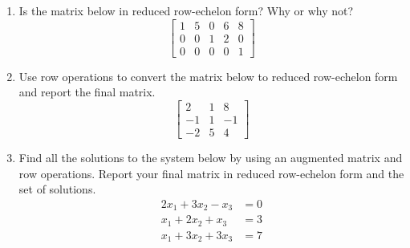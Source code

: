 \begin{enumerate}
\item Is the matrix below in reduced row-echelon form?  Why or why
not?
%
\begin{equation*}
\begin{bmatrix}
1 & 5 & 0 & 6 & 8\\
0 & 0 & 1 & 2 & 0\\
0 & 0 & 0 & 0 & 1
\end{bmatrix}
\end{equation*}
%
\item Use row operations to convert the matrix below to reduced
row-echelon form and report the final matrix.
%
\begin{equation*}
\begin{bmatrix}
2 & 1 & 8\\
-1 & 1 & -1\\
-2 & 5 & 4
\end{bmatrix}
\end{equation*}
%
\item Find all the solutions to the system below by using an augmented
matrix and row operations.  Report your final matrix in reduced row-echelon form and the set of solutions.
%
\begin{align*}
2x_1 + 3x_2 - x_3&= 0\\
x_1 + 2x_2 + x_3&= 3\\
x_1 + 3x_2 + 3x_3&= 7
\end{align*}
%
\end{enumerate}
